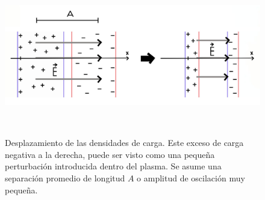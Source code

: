 \documentclass[../main.tex]{subfiles}
\begin{document}
        \begin{figure}[h]
        \centering
        \includegraphics[width=17cm,height=7cm]{Images/frecuencia_plasmas.jpg}
        \caption{Desplazamiento de las densidades de carga. Este exceso de carga negativa a la derecha, puede ser visto como una pequeña perturbación introducida dentro del plasma. Se asume una separación promedio de longitud $A$ o amplitud de oscilación muy pequeña.}
        \label{fig:frecuencia_plasmas}
        \end{figure}
\end{document}
